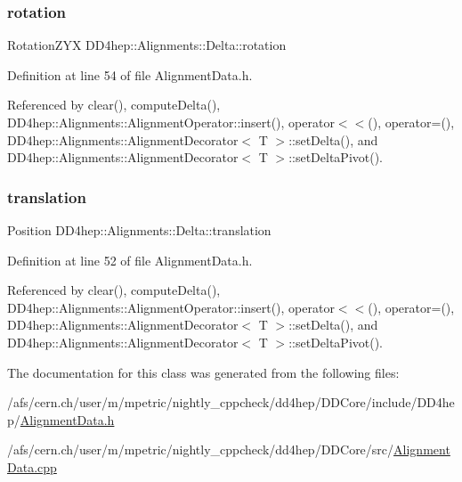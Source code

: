 \subsubsection{\texorpdfstring{rotation}{rotation}}
{\footnotesize\ttfamily Rotation\+Z\+YX D\+D4hep\+::\+Alignments\+::\+Delta\+::rotation}



Definition at line 54 of file Alignment\+Data.\+h.



Referenced by clear(), compute\+Delta(), D\+D4hep\+::\+Alignments\+::\+Alignment\+Operator\+::insert(), operator$<$$<$(), operator=(), D\+D4hep\+::\+Alignments\+::\+Alignment\+Decorator$<$ T $>$\+::set\+Delta(), and D\+D4hep\+::\+Alignments\+::\+Alignment\+Decorator$<$ T $>$\+::set\+Delta\+Pivot().

\hypertarget{class_d_d4hep_1_1_alignments_1_1_delta_af53e050fbb66b78037d8ab20a59ff737}{}\label{class_d_d4hep_1_1_alignments_1_1_delta_af53e050fbb66b78037d8ab20a59ff737} 
\subsubsection{\texorpdfstring{translation}{translation}}
{\footnotesize\ttfamily Position D\+D4hep\+::\+Alignments\+::\+Delta\+::translation}



Definition at line 52 of file Alignment\+Data.\+h.



Referenced by clear(), compute\+Delta(), D\+D4hep\+::\+Alignments\+::\+Alignment\+Operator\+::insert(), operator$<$$<$(), operator=(), D\+D4hep\+::\+Alignments\+::\+Alignment\+Decorator$<$ T $>$\+::set\+Delta(), and D\+D4hep\+::\+Alignments\+::\+Alignment\+Decorator$<$ T $>$\+::set\+Delta\+Pivot().



The documentation for this class was generated from the following files\+:\begin{DoxyCompactItemize}
\item 
/afs/cern.\+ch/user/m/mpetric/nightly\+\_\+cppcheck/dd4hep/\+D\+D\+Core/include/\+D\+D4hep/\hyperlink{_alignment_data_8h}{Alignment\+Data.\+h}\item 
/afs/cern.\+ch/user/m/mpetric/nightly\+\_\+cppcheck/dd4hep/\+D\+D\+Core/src/\hyperlink{_alignment_data_8cpp}{Alignment\+Data.\+cpp}\end{DoxyCompactItemize}
